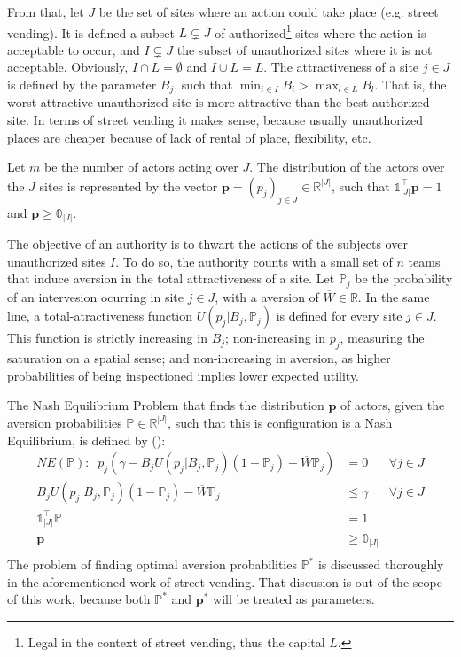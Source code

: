 \documentclass{article}
\newcommand{\pp}{\mathbf{p}}
\newcommand{\p}{\mathds{P}}
\begin{document}
From that, let $J$ be the set of sites where an action could take place (e.g. street vending). It is defined a subset $L \subsetneq J$ of authorized\footnote{Legal in the context of street vending, thus the capital $L$.} sites where the action is acceptable to occur, and $I\subsetneq J$ the subset of unauthorized sites where it is not acceptable. Obviously, $I \cap L = \emptyset$ and $I \cup L = L$. The attractiveness of a site $j \in J$ is defined by the parameter $B_j$, such that $\min_{i \in I} B_i > \max_{l \in L} B_l$. That is, the worst attractive unauthorized site is more attractive than the best authorized site. In terms of street vending it makes sense, because usually unauthorized places are cheaper because of lack of rental of place, flexibility, etc.\par
Let $m$ be the number of actors acting over $J$. The distribution of the actors over the $J$ sites is represented by the vector $\pp = (p_j)_{j\in J} \in \mathbb{R}^{|J|}$, such that $\mathbb{1}_{|J|}^\top\pp = 1$ and $\pp \geq \mathbb{0}_{|J|}$.\par
The objective of an authority is to thwart the actions of the subjects over unauthorized sites $I$. To do so, the authority counts with a small set of $n$ teams that induce aversion in the total attractiveness of a site. Let $\p_j$ be the probability of an intervesion ocurring in site $j \in J$, with a aversion of $\overline{W} \in \mathbb{R}$. In the same line, a total-atractiveness function $U(p_j \vert B_j, \p_j)$ is defined for every site $j \in J$. This function is strictly increasing in $B_j$; non-increasing in $p_j$, measuring the saturation on a spatial sense; and non-increasing in aversion, as higher probabilities of being inspectioned implies lower expected utility.\par
The Nash Equilibrium Problem that finds the distribution $\pp$ of actors, given the aversion probabilities $\p \in \mathds{R}^{|J|}$, such that this is configuration is a Nash Equilibrium, is defined by (\citep{Carrasco}):
\begin{align*}
	NE(\p) :  \;\; p_j(\gamma -B_j U(p_j\vert B_j, \p_j)(1-\p_j) - \overline{W}\p_j) &= 0 & \forall j \in J\\
	B_j U(p_j\vert B_j, \p_j)(1-\p_j) - \overline{W}\p_j &\leq \gamma& \forall j \in J\\
	\mathbb{1}^{\top}_{|J|}\p  &= 1&\\
	\pp &\geq \mathbb{0}_{|J|}& \\
\end{align*} 
The problem of finding optimal aversion probabilities $\p^*$ is discussed thoroughly in the aforementioned work of street vending. That discusion is out of the scope of this work, because both $\p^*$ and $\pp^*$ will be treated as parameters.\par
\end{document}
